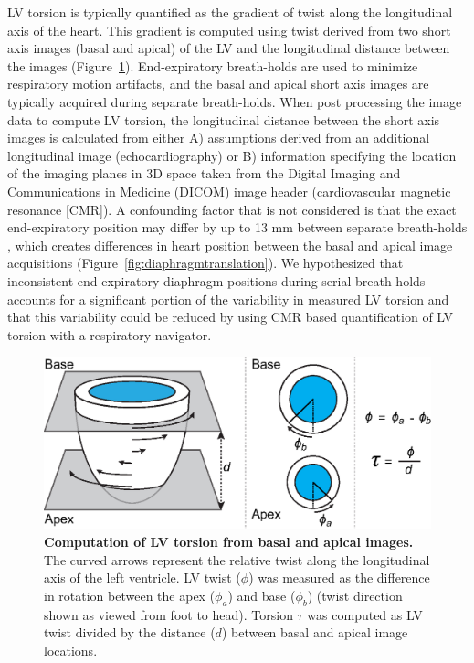 	LV torsion is typically quantified as the gradient of twist along the longitudinal axis of the heart. This gradient is computed using twist derived from two short axis images (basal and apical) of the LV and the longitudinal distance between the images \cite{Donekal2013a} (Figure~\ref{fig:lvtorsion}). End-expiratory breath-holds are used to minimize respiratory motion artifacts, and the basal and apical short axis images are typically acquired during separate breath-holds. When post processing the image data to compute LV torsion, the longitudinal distance between the short axis images is calculated from either A) assumptions derived from an additional longitudinal image (echocardiography) or B) information specifying the location of the imaging planes in 3D space taken from the Digital Imaging and Communications in Medicine (DICOM) image header (cardiovascular magnetic resonance [CMR]). A confounding factor that is not considered is that the exact end-expiratory position may differ by up to 13 mm between separate breath-holds \cite{Liu1993,Wang1995a,Taylor1997a,Holland1998c,Fischer2006a}, which creates differences in heart position between the basal and apical image acquisitions (Figure~\ref{fig:diaphragmtranslation}). We hypothesized that inconsistent end-expiratory diaphragm positions during serial breath-holds accounts for a significant portion of the variability in measured LV torsion and that this variability could be reduced by using CMR based quantification of LV torsion with a respiratory navigator.
	
	\begin{figure} 
		\includegraphics{figures/torsionpaper/Fig1-LVtorsion}
		\caption[Computation of LV torsion from basal and apical images]{\textbf{Computation of LV torsion from basal and apical images.} The curved arrows represent the relative twist along the longitudinal axis of the left ventricle. LV twist ($\phi$) was measured as the difference in rotation between the apex ($\phi_a$) and base ($\phi_b$) (twist direction shown as viewed from foot to head). Torsion $\tau$ was computed as LV twist divided by the distance ($d$) between basal and apical image locations.}
		\label{fig:lvtorsion}
	\end{figure}
	
